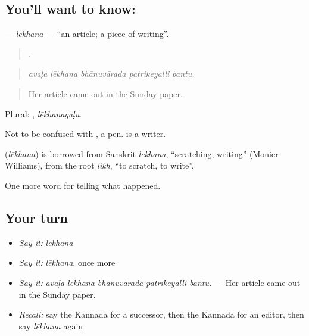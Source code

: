 \subsection*{You'll want to know: }
\textbf{} — \emph{lēkhana} — \textquotedblleft{}an article; a piece of writing\textquotedblright{}.

\begin{quote}
    .
\end{quote}

\begin{quote}
\emph{avaḷa lēkhana bhānuvārada patrikeyalli bantu.}
\end{quote}

\begin{quote}
Her article came out in the Sunday paper.
\end{quote}

Plural: , \emph{lēkhanagaḷu}.

Not to be confused with , a pen.  is a writer.

\begin{cousinweb}
\textbf{} (\emph{lēkhana}) is borrowed from Sanskrit \emph{lekhana}, \textquotedblleft{}scratching, writing\textquotedblright{} (Monier-Williams), from the root \emph{likh}, \textquotedblleft{}to scratch, to write\textquotedblright{}.
\end{cousinweb}

\begin{grammarlens}[title={What you've built}]
One more word for telling what happened.
\end{grammarlens}

\subsection*{Your turn}
\begin{itemize}
\raggedright
  \item \emph{Say it:} \emph{lēkhana}
  \item \emph{Say it:} \emph{lēkhana}, once more
  \item \emph{Say it:} \emph{avaḷa lēkhana bhānuvārada patrikeyalli bantu.} — Her article came out in the Sunday paper.
  \item \emph{Recall:} say the Kannada for a successor, then the Kannada for an editor, then say \emph{lēkhana} again
\end{itemize}

